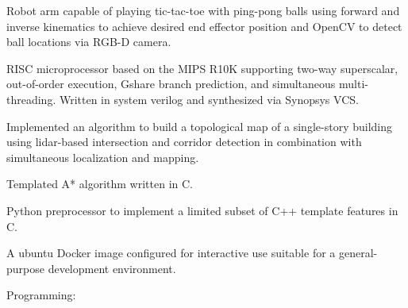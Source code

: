 \documentclass[11pt, a4paper]{cv}
\begin{document}
\begin{cv}
\begin{projects}
\begin{cventries}
{}
{}
{}
{\begin{cvparagraph}
Robot arm capable of playing tic-tac-toe with ping-pong balls using forward and inverse kinematics to achieve desired end effector position and OpenCV to detect ball locations via RGB-D camera.
\end{cvparagraph}}
\cventry
{}
{}
{}
{}
{\begin{cvparagraph}
RISC microprocessor based on the MIPS R10K supporting two-way superscalar, out-of-order execution, Gshare branch prediction, and simultaneous multi-threading. Written in system verilog and synthesized via Synopsys VCS.
\end{cvparagraph}}
\cventry
{}
{}
{}
{}
{\begin{cvparagraph}
Implemented an algorithm to build a topological map of a single-story building using lidar-based intersection and corridor detection in combination with simultaneous localization and mapping.
\end{cvparagraph}}
\cventry
{}
{}
{}
{}
{\begin{cvparagraph}
Templated A* algorithm written in C.
\end{cvparagraph}}
\cventry
{}
{}
{}
{}
{\begin{cvparagraph}
Python preprocessor to implement a limited subset of C++ template features in C.
\end{cvparagraph}}
\cventry
{}
{}
{}
{}
{\begin{cvparagraph}
A ubuntu Docker image configured for interactive use suitable for a general-purpose development environment.
\end{cvparagraph}}
\end{cventries}
\end{projects}
\begin{skillsets}
%
\begin{cventries}
\titledItem
{Programming:}
{\begin{skills}
%
%
%
%
%
%
%
%
%
%
\end{skills}}

\end{cventries}
\end{skillsets}
\end{cv}
\end{document}
